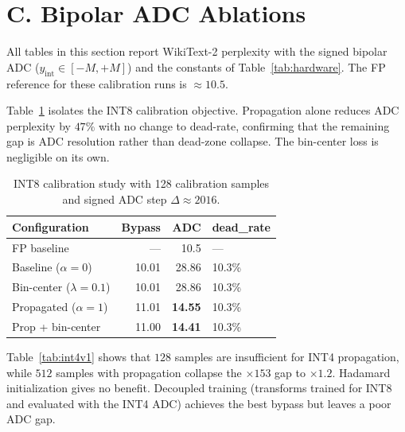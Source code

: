 \documentclass[letterpaper]{article} %
\theoremstyle{plain}
\begin{document}
\section{C. Bipolar ADC Ablations}

All tables in this section report WikiText-2 perplexity with the signed bipolar ADC ($y_{\mathrm{int}}\in[-M,+M]$) and the constants of Table~\ref{tab:hardware}. The FP reference for these calibration runs is $\approx 10.5$.

Table~\ref{tab:int8} isolates the INT8 calibration objective. Propagation alone reduces ADC perplexity by $47\%$ with no change to dead-rate, confirming that the remaining gap is ADC resolution rather than dead-zone collapse. The bin-center loss is negligible on its own.

\begin{table}[htbp]
\centering
\begin{tabular}{@{}lrrl@{}}
\toprule
\textbf{Configuration} & \textbf{Bypass} & \textbf{ADC} & \textbf{dead\_rate} \\
\midrule
FP baseline            & ---   & 10.5  & --- \\
Baseline ($\alpha=0$)  & 10.01 & 28.86 & 10.3\% \\
Bin-center ($\lambda=0.1$) & 10.01 & 28.86 & 10.3\% \\
Propagated ($\alpha=1$)    & 11.01 & \textbf{14.55} & 10.3\% \\
Prop + bin-center          & 11.00 & \textbf{14.41} & 10.3\% \\
\bottomrule
\end{tabular}
\caption{INT8 calibration study with 128 calibration samples and signed ADC step $\Delta\approx2016$.}
\label{tab:int8}
\end{table}

Table~\ref{tab:int4v1} shows that $128$ samples are insufficient for INT4 propagation, while $512$ samples with propagation collapse the $\times153$ gap to $\times1.2$. Hadamard initialization gives no benefit. Decoupled training (transforms trained for INT8 and evaluated with the INT4 ADC) achieves the best bypass but leaves a poor ADC gap.
\end{document}
